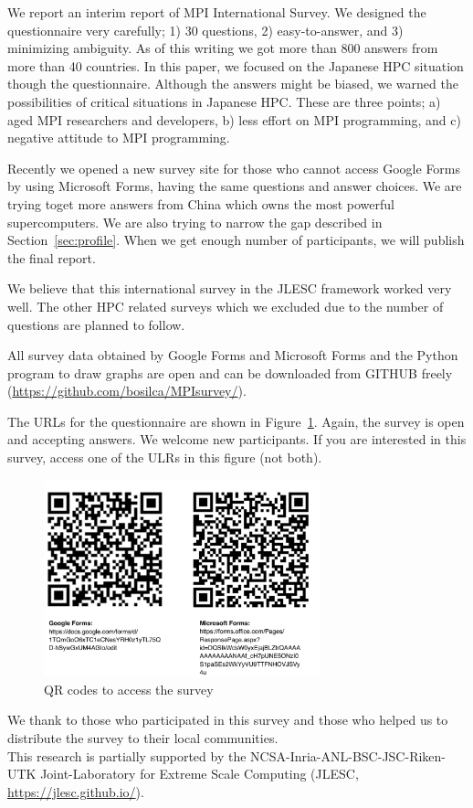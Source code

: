 \documentclass[submit,techrep,noauthor,english]{ipsj}
\begin{document}
We report an interim report of MPI International Survey. We designed
the questionnaire very carefully; 1) 30 questions, 2) easy-to-answer,
and 3) minimizing ambiguity. As of this writing we got more than 800
answers from more than 40 countries. In this paper, we focused on the
Japanese HPC situation though the questionnaire. Although the answers
might be biased, we warned the possibilities of critical situations
in Japanese HPC. These are three points; a) aged MPI researchers and
developers, b) less effort on MPI programming, and c) negative
attitude to MPI programming. 

Recently we opened a new survey site for those who cannot access
Google Forms by using Microsoft Forms, having the same questions and
answer choices. We are trying toget more answers from China which owns
the most powerful supercomputers. We are also trying to narrow the gap
described in Section~\ref{sec:profile}. When we get enough number of
participants, we will publish the final report.

We believe that this international survey in the JLESC framework worked
very well.  The other HPC related surveys which we excluded due to the
number of questions are planned to follow.

All survey data obtained by Google Forms and Microsoft Forms and the
Python program to draw graphs are open and can be downloaded from
GITHUB freely (\url{https://github.com/bosilca/MPIsurvey/}).

The URLs for the questionnaire are shown in
Figure~\ref{fig:QR-codes}. Again, the survey is open and accepting
answers. We welcome new participants. If you are interested in
this survey, access one of the ULRs in this figure (not both).

\begin{figure}[htb]
\begin{center}
\includegraphics[width=8cm]{figs/QR-codes.pdf}
\caption{QR codes to access the survey}
\label{fig:QR-codes}
\end{center}
\end{figure}

\begin{acknowledgment}
  We thank to those who participated in this survey and those who
  helped us to distribute the survey to their local communities.\\
  This research is partially supported by the
  NCSA-Inria-ANL-BSC-JSC-Riken-UTK Joint-Laboratory for Extreme Scale
  Computing (JLESC, \url{https://jlesc.github.io/}).
\end{acknowledgment}




\end{document}
